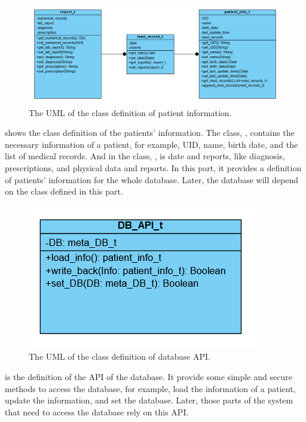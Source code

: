 \documentclass{article}
\begin{document}
  \begin{figure}[h]
    \centering
    \includegraphics[scale = 0.7]{asset/database/pinfo.png}
    \caption{The UML of the class definition of patient information.}
    \label{fig:pinfo_UML}
  \end{figure}
   shows the class definition of the patients' information. 
  The class, , contains the necessary information of 
  a patient, for example, UID, name, birth date, and the list of medical records. 
  And in the class, , is date and reports, like diagnosis, 
  prescriptions, and physical data and reports. 
  In this part, it provides a definition of patients' information for the whole 
  database. Later, the database will depend on the class defined in this part. 

  \begin{figure}[h]
    \centering
    \includegraphics[scale = 0.7]{asset/database/DB_API.png}
    \caption{The UML of the class definition of database API.}
    \label{fig:API_UML}
  \end{figure}
   is the definition of the API of the database. It provide 
  some simple and secure methods to access the database, for example, load the 
  information of a patient, update the information, and set the database. 
  Later, those parts of the system that need to access the database rely on 
  this API. 
\end{document}
